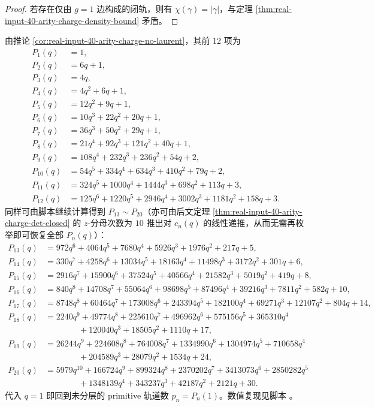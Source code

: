 \begin{proof}
若存在仅由 $g=1$ 边构成的闭轨，则有 $\chi(\gamma)=|\gamma|$，与定理 \ref{thm:real-input-40-arity-charge-density-bound} 矛盾。
\end{proof}

由推论 \ref{cor:real-input-40-arity-charge-no-laurent}，其前 12 项为
\[
\begin{aligned}
P_1(q)&=1,\\
P_2(q)&=6q+1,\\
P_3(q)&=4q,\\
P_4(q)&=4q^2+6q+1,\\
P_5(q)&=12q^2+9q+1,\\
P_6(q)&=10q^3+22q^2+20q+1,\\
P_7(q)&=36q^3+50q^2+29q+1,\\
P_8(q)&=21q^4+92q^3+121q^2+40q+1,\\
P_9(q)&=108q^4+232q^3+236q^2+54q+2,\\
P_{10}(q)&=54q^5+334q^4+634q^3+410q^2+79q+2,\\
P_{11}(q)&=324q^5+1000q^4+1444q^3+698q^2+113q+3,\\
P_{12}(q)&=125q^6+1220q^5+2946q^4+3002q^3+1181q^2+158q+3.
\end{aligned}
\]
同样可由脚本继续计算得到 $P_{13}\sim P_{20}$（亦可由后文定理 \ref{thm:real-input-40-arity-charge-det-closed} 的 $z$-分母次数为 $10$ 推出对 $c_n(q)$ 的线性递推，从而无需再枚举即可恢复全部 $P_n(q)$）：
\[
\begin{aligned}
P_{13}(q)&=972q^6+4064q^5+7680q^4+5926q^3+1976q^2+217q+5,\\
P_{14}(q)&=330q^7+4258q^6+13034q^5+18163q^4+11498q^3+3172q^2+301q+6,\\
P_{15}(q)&=2916q^7+15900q^6+37524q^5+40566q^4+21582q^3+5019q^2+419q+8,\\
P_{16}(q)&=840q^8+14708q^7+55064q^6+98698q^5+87496q^4+39216q^3+7811q^2+582q+10,\\
P_{17}(q)&=8748q^8+60464q^7+173008q^6+243394q^5+182100q^4+69271q^3+12107q^2+804q+14,\\
P_{18}(q)&=2240q^9+49774q^8+225610q^7+496962q^6+575156q^5+365310q^4\\
&\qquad\qquad+120040q^3+18505q^2+1110q+17,\\
P_{19}(q)&=26244q^9+224608q^8+764008q^7+1334990q^6+1304974q^5+710658q^4\\
&\qquad\qquad+204589q^3+28079q^2+1534q+24,\\
P_{20}(q)&=5979q^{10}+166724q^9+899324q^8+2370202q^7+3413073q^6+2850282q^5\\
&\qquad\qquad+1348139q^4+343237q^3+42187q^2+2121q+30.
\end{aligned}
\]
代入 $q=1$ 即回到未分层的 primitive 轨道数 $p_n=P_n(1)$。数值复现见脚本
。

